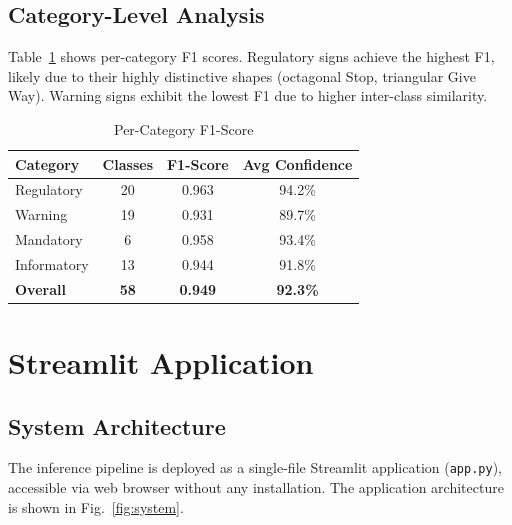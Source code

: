 \documentclass[journal,10pt,twocolumn]{IEEEtran}
\begin{document}
\subsection{Category-Level Analysis}

Table~\ref{tab:catresults} shows per-category F1 scores. Regulatory signs
achieve the highest F1, likely due to their highly distinctive shapes (octagonal
Stop, triangular Give Way). Warning signs exhibit the lowest F1 due to higher
inter-class similarity.

\begin{table}[H]
\centering
\caption{Per-Category F1-Score}
\label{tab:catresults}
\begin{tabular}{lccc}
\toprule
\textbf{Category} & \textbf{Classes} & \textbf{F1-Score} & \textbf{Avg Confidence} \\
\midrule
Regulatory  & 20 & 0.963 & 94.2\% \\
Warning     & 19 & 0.931 & 89.7\% \\
Mandatory   & 6  & 0.958 & 93.4\% \\
Informatory & 13 & 0.944 & 91.8\% \\
\midrule
\textbf{Overall} & \textbf{58} & \textbf{0.949} & \textbf{92.3\%} \\
\bottomrule
\end{tabular}
\end{table}

\section{Streamlit Application}
\label{sec:application}

\subsection{System Architecture}

The inference pipeline is deployed as a single-file Streamlit application
(\texttt{app.py}), accessible via web browser without any installation. The
application architecture is shown in Fig.~\ref{fig:system}.
\end{document}

